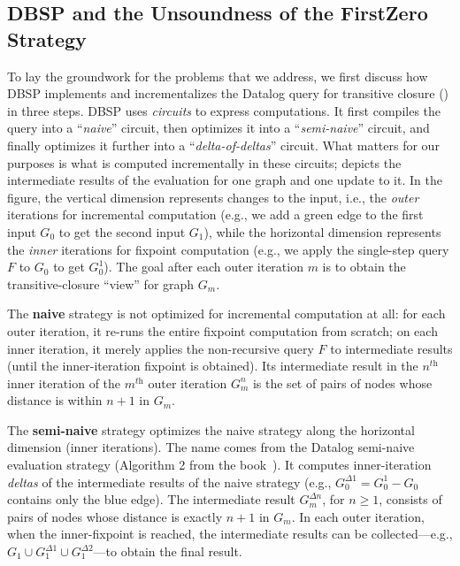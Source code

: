 \subsection{DBSP and the Unsoundness of the FirstZero Strategy}\label{sec:overview-problem}

To lay the groundwork for the problems that we address, we first discuss how DBSP implements and incrementalizes the Datalog query for transitive closure () in three steps.
DBSP uses \textit{circuits} to express computations. It first compiles the query into a
``\emph{naive}'' circuit, then optimizes it into a ``\emph{semi-naive}'' circuit, and
finally optimizes it further into a ``\emph{delta-of-deltas}'' circuit. What matters for
our purposes is what is computed incrementally in these circuits;
 depicts the intermediate results of the evaluation
for one graph and one update to it.
In the figure, the vertical dimension represents changes to the input, i.e., the \emph{outer} iterations for incremental computation (e.g., we add a green edge to the first input $G_0$ to get the second input $G_1$), while the horizontal dimension represents the \emph{inner} iterations for fixpoint computation (e.g., we apply the single-step query $F$ to $G_0$ to get $G_0^1$).
The goal after each outer iteration $m$ is to obtain the transitive-closure
``view'' for graph $G_m$.

The \textbf{naive}
strategy is not optimized for incremental computation at all:
for each outer iteration, it re-runs the entire fixpoint computation from scratch;
on each inner iteration, it merely applies the non-recursive query $F$ to intermediate results (until the inner-iteration fixpoint is obtained).
Its intermediate result in the $n^{\textit{th}}$ inner iteration of the $m^{\textit{th}}$ outer iteration $G_m^n$
is the set of pairs of nodes whose distance is within $n+1$ in $G_m$.

The \textbf{semi-naive} strategy optimizes the naive strategy along the horizontal dimension (inner iterations).
The name
comes from the Datalog semi-naive evaluation strategy (Algorithm 2 from the book~\cite{Greco2015DatalogAL}).
It computes inner-iteration \emph{deltas}
of the intermediate results of the naive strategy (e.g., $G_0^{\Delta 1} = G_0^1 - G_0$ contains only the blue edge).
The intermediate result $G_m^{\Delta n}$, for $n \geq 1$, consists of
pairs of nodes whose distance is exactly $n+1$ in $G_m$.
In each outer iteration, when the inner-fixpoint is reached,
the intermediate results can be collected---e.g., $G_1 \cup G_1^{\Delta 1} \cup G_1^{\Delta 2}$---to obtain the final result.


